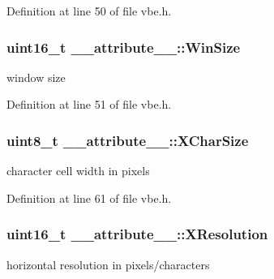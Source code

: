 Definition at line 50 of file vbe.\+h.

\hypertarget{struct____attribute_____ad26e754fe362f3085c7ec4c0e5e75a6f}{}
\subsubsection[{Win\+Size}]{\setlength{\rightskip}{0pt plus 5cm}uint16\+\_\+t \+\_\+\+\_\+attribute\+\_\+\+\_\+\+::\+Win\+Size}\label{struct____attribute_____ad26e754fe362f3085c7ec4c0e5e75a6f}


window size 



Definition at line 51 of file vbe.\+h.

\hypertarget{struct____attribute_____acac41a300563737d7849a92cd1d5c10b}{}
\subsubsection[{X\+Char\+Size}]{\setlength{\rightskip}{0pt plus 5cm}uint8\+\_\+t \+\_\+\+\_\+attribute\+\_\+\+\_\+\+::\+X\+Char\+Size}\label{struct____attribute_____acac41a300563737d7849a92cd1d5c10b}


character cell width in pixels 



Definition at line 61 of file vbe.\+h.

\hypertarget{struct____attribute_____abe48e2b29aa99e813a1447d22711f4f4}{}
\subsubsection[{X\+Resolution}]{\setlength{\rightskip}{0pt plus 5cm}uint16\+\_\+t \+\_\+\+\_\+attribute\+\_\+\+\_\+\+::\+X\+Resolution}\label{struct____attribute_____abe48e2b29aa99e813a1447d22711f4f4}


horizontal resolution in pixels/characters 



